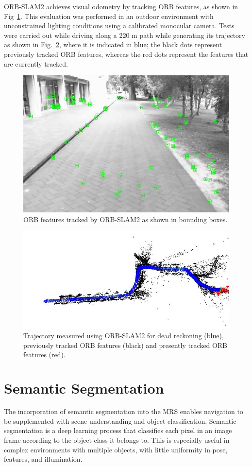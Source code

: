ORB-SLAM2 achieves visual odometry by tracking ORB features, as shown in Fig~\ref{fig:4:orb1}. This evaluation was performed in an outdoor environment with unconstrained lighting conditions using a calibrated monocular camera. Tests were carried out while driving along a 220 m path while generating its trajectory as shown in Fig.~\ref{fig:4:orb2}, where it is indicated in blue; the black dots represent previously tracked ORB features, whereas the red dots represent the features that are currently tracked.

\begin{figure}[H]
	\centering
	\includegraphics[width=0.8\linewidth]{fig10}
	\caption[Tracked ORB features]{ORB features tracked by ORB-SLAM2 as shown in bounding boxes.}
	\label{fig:4:orb1}
\end{figure}

\begin{figure}[H]
	\centering
	\includegraphics[width=0.8\linewidth]{fig11}
	\caption[ORB-SLAM2 trajectory]{Trajectory measured using ORB-SLAM2 for dead reckoning (blue), previously tracked ORB features (black) and presently tracked ORB features (red).}
	\label{fig:4:orb2}
\end{figure}

\section{Semantic Segmentation}\label{sec:4:semseg}
The incorporation of semantic segmentation into the MRS enables navigation to be supplemented with scene understanding and object classification. Semantic segmentation is a deep learning process that classifies each pixel in an image frame according to the object class it belongs to. This is especially useful in complex environments with multiple objects, with little uniformity in pose, features, and illumination.

